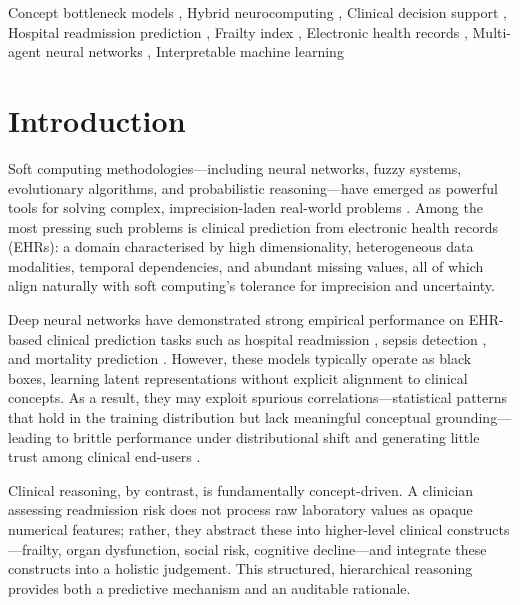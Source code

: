 \documentclass[review,12pt,authoryear]{elsarticle}
\begin{document}
\begin{frontmatter}
\begin{keyword}
Concept bottleneck models \sep
Hybrid neurocomputing \sep
Clinical decision support \sep
Hospital readmission prediction \sep
Frailty index \sep
Electronic health records \sep
Multi-agent neural networks \sep
Interpretable machine learning
\end{keyword}

\end{frontmatter}

\section{Introduction}
\label{sec:intro}

Soft computing methodologies—including neural networks, fuzzy systems, evolutionary algorithms, and probabilistic reasoning—have emerged as powerful tools for solving complex, imprecision-laden real-world problems \citep{zadeh1994soft}.
Among the most pressing such problems is clinical prediction from electronic health records (EHRs): a domain characterised by high dimensionality, heterogeneous data modalities, temporal dependencies, and abundant missing values, all of which align naturally with soft computing's tolerance for imprecision and uncertainty.

Deep neural networks have demonstrated strong empirical performance on EHR-based clinical prediction tasks such as hospital readmission \citep{choi2016retain}, sepsis detection \citep{henry2015targeted}, and mortality prediction \citep{rajpurkar2017chexnet}.
However, these models typically operate as black boxes, learning latent representations without explicit alignment to clinical concepts.
As a result, they may exploit spurious correlations—statistical patterns that hold in the training distribution but lack meaningful conceptual grounding—leading to brittle performance under distributional shift \citep{subbaswamy2021evaluating} and generating little trust among clinical end-users \citep{rudin2019stop}.

Clinical reasoning, by contrast, is fundamentally concept-driven.
A clinician assessing readmission risk does not process raw laboratory values as opaque numerical features; rather, they abstract these into higher-level clinical constructs—frailty, organ dysfunction, social risk, cognitive decline—and integrate these constructs into a holistic judgement.
This structured, hierarchical reasoning provides both a predictive mechanism and an auditable rationale.
\end{document}
